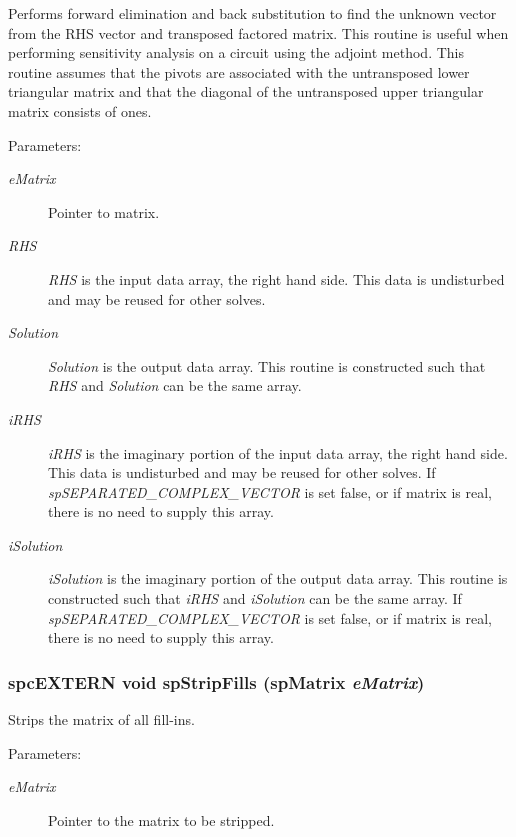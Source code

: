 Performs forward elimination and back substitution to find the unknown vector from the RHS vector and transposed factored matrix. This routine is useful when performing sensitivity analysis on a circuit using the adjoint method. This routine assumes that the pivots are associated with the untransposed lower triangular matrix and that the diagonal of the untransposed upper triangular matrix consists of ones.\begin{Desc}
\item[Parameters: ]\par
\begin{description}
\item[{\em 
e\-Matrix}]Pointer to matrix. \item[{\em 
RHS}]{\em RHS} is the input data array, the right hand side. This data is undisturbed and may be reused for other solves. \item[{\em 
Solution}]{\em Solution} is the output data array. This routine is constructed such that {\em RHS} and {\em Solution} can be the same array. \item[{\em 
i\-RHS}]{\em i\-RHS} is the imaginary portion of the input data array, the right hand side. This data is undisturbed and may be reused for other solves. If {\em sp\-SEPARATED\_\-COMPLEX\_\-VECTOR} is set false, or if matrix is real, there is no need to supply this array. \item[{\em 
i\-Solution}]{\em i\-Solution} is the imaginary portion of the output data array. This routine is constructed such that {\em i\-RHS} and {\em i\-Solution} can be the same array. If {\em sp\-SEPARATED\_\-COMPLEX\_\-VECTOR} is set false, or if matrix is real, there is no need to supply this array. \end{description}
\end{Desc}
\subsubsection{\setlength{\rightskip}{0pt plus 5cm}spc\-EXTERN void sp\-Strip\-Fills ({\bf sp\-Matrix} {\em e\-Matrix})}\label{spMatrix_8h_a54}


Strips the matrix of all fill-ins.\begin{Desc}
\item[Parameters: ]\par
\begin{description}
\item[{\em 
e\-Matrix}]Pointer to the matrix to be stripped. \end{description}
\end{Desc}
